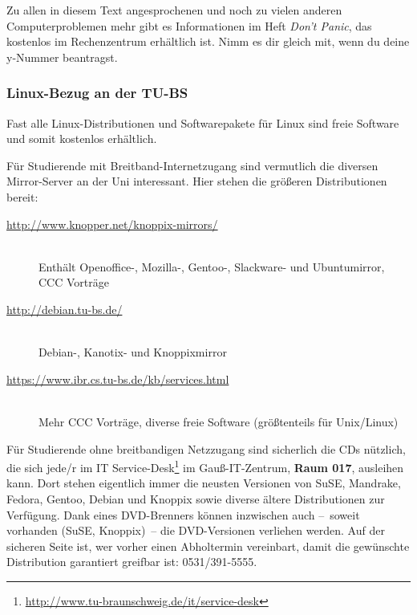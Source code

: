		Zu allen in diesem Text angesprochenen und noch zu vielen anderen Computerproblemen mehr gibt es Informationen im Heft \emph{Don't Panic}, das kostenlos im Rechenzentrum erhältlich ist. Nimm es dir gleich mit, wenn du deine y-Nummer beantragst.

	\subsubsection{Linux-Bezug an der TU-BS}
		Fast alle Linux-Distributionen und Softwarepakete für Linux sind freie Software und somit kostenlos erhältlich.

		Für Studierende mit Breitband-Internetzugang sind vermutlich die diversen Mirror-Server an der Uni interessant. Hier stehen die größeren Distributionen bereit:
	  
		\begin{description}
			\item[\url{http://www.knopper.net/knoppix-mirrors/}]~\\Enthält Openoffice-, Mozilla-, Gentoo-, Slackware- und Ubuntumirror, CCC Vorträge
			\item[\url{http://debian.tu-bs.de/}]~\\Debian-, Kanotix- und Knoppixmirror
			\item[\url{https://www.ibr.cs.tu-bs.de/kb/services.html}]~\\Mehr CCC Vorträge, diverse freie Software (größtenteils für Unix/Linux)
		\end{description}

		Für Studierende ohne breitbandigen Netzzugang sind sicherlich die CDs nützlich, die sich jede/r im IT Service-Desk\footnote{\url{http://www.tu-braunschweig.de/it/service-desk}} im Gauß-IT-Zentrum, \textbf{Raum 017}, ausleihen kann. Dort stehen eigentlich immer die neusten Versionen von SuSE, Mandrake, Fedora, Gentoo, Debian und Knoppix sowie diverse ältere Distributionen zur Verfügung. Dank eines DVD-Brenners können inzwischen auch --~soweit vorhanden (SuSE, Knoppix)~-- die DVD-Versionen verliehen werden. Auf der sicheren Seite ist, wer vorher einen Abholtermin vereinbart, damit die gewünschte Distribution garantiert greifbar ist: 0531/391-5555.
